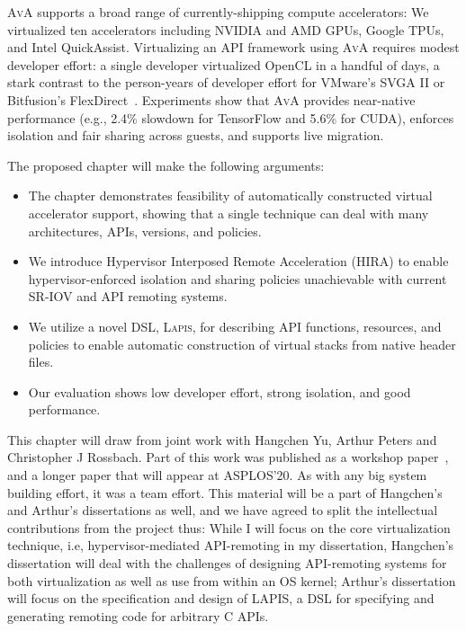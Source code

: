 \textsc{AvA} supports a broad range of currently-shipping compute accelerators:
We virtualized ten accelerators including NVIDIA and AMD GPUs, Google TPUs,
and Intel QuickAssist.
Virtualizing an API framework using \textsc{AvA} requires modest developer
effort:
a single developer virtualized OpenCL in a handful of days,
a stark contrast to the person-years of developer effort for VMware's SVGA II
or Bitfusion's FlexDirect~\cite{bitfusion}.
Experiments show that \textsc{AvA} provides near-native performance (e.g., 2.4\% slowdown for TensorFlow and 5.6\% for CUDA), enforces isolation and fair sharing across guests, and supports live migration.

The proposed chapter will make the following arguments:

\begin{itemize}[nosep,leftmargin=1em,labelwidth=*,align=left]
\item The chapter demonstrates feasibility of automatically constructed virtual accelerator support, showing that a single technique can deal with many architectures, APIs, versions, and policies.
\item We introduce {{H}ypervisor {I}nterposed {R}emote {A}cceleration} (HIRA) to enable hypervisor-enforced isolation and sharing policies unachievable with current SR-IOV and API remoting systems.
\item We utilize a novel DSL, \textsc{Lapis}, for describing API functions, resources, and policies to enable automatic construction of virtual stacks from native header files.
\item Our evaluation shows low developer effort, strong isolation, and good performance.
\end{itemize}

This chapter will draw from joint work with Hangchen Yu, Arthur Peters and
Christopher J Rossbach. Part of this work was published as a workshop
paper~\cite{ava-hotos}, and a longer paper that will appear at ASPLOS'20.
As with any big system building effort, it was a team effort.
This material will be a part of Hangchen's and Arthur's dissertations as well,
and we have agreed to split the intellectual contributions from the project
thus: While I will focus on the core virtualization technique, i.e,
hypervisor-mediated API-remoting in my dissertation, Hangchen's dissertation
will deal with the challenges of designing API-remoting systems for both
virtualization as well as use from within an OS kernel; Arthur's dissertation
will focus on the specification and design of LAPIS, a DSL for specifying and
generating remoting code for arbitrary C APIs.
